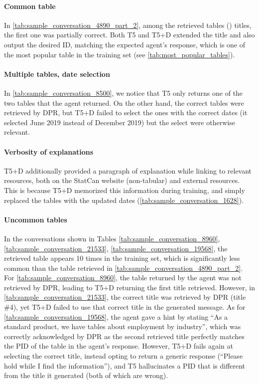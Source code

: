 \documentclass[11pt]{article}
\begin{document}
\paragraph{Common table} In \autoref{tab:sample_conversation_4890_part_2}, among the retrieved tables () titles, the first one was partially correct. Both T5 and T5+D extended the title and also output the desired ID, matching the expected agent's response, which is one of the most popular table in the training set (see \autoref{tab:most_popular_tables}).

\paragraph{Multiple tables, date selection} In \autoref{tab:sample_conversation_8500}, we notice that T5 only returns one of the two tables that the agent returned. On the other hand, the correct tables were retrieved by DPR, but T5+D failed to select the ones with the correct dates (it selected June 2019 instead of December 2019) but the select were otherwise relevant. 

\paragraph{Verbosity of explanations} T5+D additionally provided a paragraph of explanation while linking to relevant resources, both on the StatCan website (non-tabular) and external resources. This is because T5+D memorized this information during training, and simply replaced the tables with the updated dates (\autoref{tab:sample_conversation_1628}).

\paragraph{Uncommon tables} In the conversations shown in Tables \ref{tab:sample_conversation_8960}, \ref{tab:sample_conversation_21533}, \ref{tab:sample_conversation_19568}, the retrieved table appears 10 times in the training set, which is significantly less common than the table retrieved in \autoref{tab:sample_conversation_4890_part_2}. For \autoref{tab:sample_conversation_8960}, the table returned by the agent was not retrieved by DPR, leading to T5+D returning the first title retrieved. However, in \autoref{tab:sample_conversation_21533}, the correct title was retrieved by DPR (title \#4), yet T5+D failed to use that correct title in the generated message. As for \autoref{tab:sample_conversation_19568}, the agent gave a hint by stating ``As a standard product, we have tables about employment by industry'', which was correctly acknowledged by DPR as the second retrieved title perfectly matches the PID of the table in the agent's response. However, T5+D fails again at selecting the correct title, instead opting to return a generic response (``Please hold while I find the information''), and T5 hallucinates a PID that is different from the title it generated (both of which are wrong).
\end{document}
